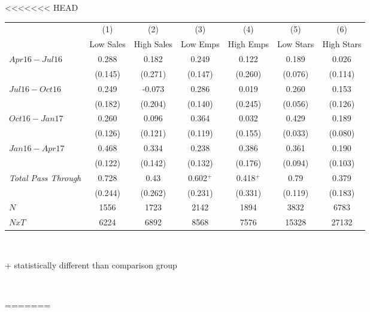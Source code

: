 <<<<<<< HEAD
\begin{center}
\begin{tabular}{lcccccc}
\hline  & (1) & (2) & (3) & (4) & (5) & (6)\\
 & Low Sales & High Sales & Low Emps & High Emps & Low Stars & High Stars\\
\hline  $ Apr16-Jul16 $  & 0.288 & 0.182 & 0.249 & 0.122 & 0.189 & 0.026\\
 & (0.145) & (0.271) & (0.147) & (0.260) & (0.076) & (0.114)\\
 $ Jul16-Oct16 $  & 0.249 & -0.073 & 0.286 & 0.019 & 0.260 & 0.153\\
 & (0.182) & (0.204) & (0.140) & (0.245) & (0.056) & (0.126)\\
 $ Oct16-Jan17 $  & 0.260 & 0.096 & 0.364 & 0.032 & 0.429 & 0.189\\
 & (0.126) & (0.121) & (0.119) & (0.155) & (0.033) & (0.080)\\
 $ Jan16-Apr17 $  & 0.468 & 0.334 & 0.238 & 0.386 & 0.361 & 0.190\\
 & (0.122) & (0.142) & (0.132) & (0.176) & (0.094) & (0.103)\\
\hline \textit{Total Pass Through} & 0.728 & 0.43 & 0.602$^+$ & 0.418$^+$ & 0.79 & 0.379\\
  & (0.244) & (0.262) & (0.231) & (0.331) & (0.119) & (0.183)\\
\hline  $ N $  & 1556 & 1723 & 2142 & 1894 & 3832 & 6783\\
 $ NxT $  & 6224 & 6892 & 8568 & 7576 & 15328 & 27132\\
\hline\end{tabular}\\
\begin{tiny} + statistically different than comparison group \end{tiny}\\
\end{center}
=======
